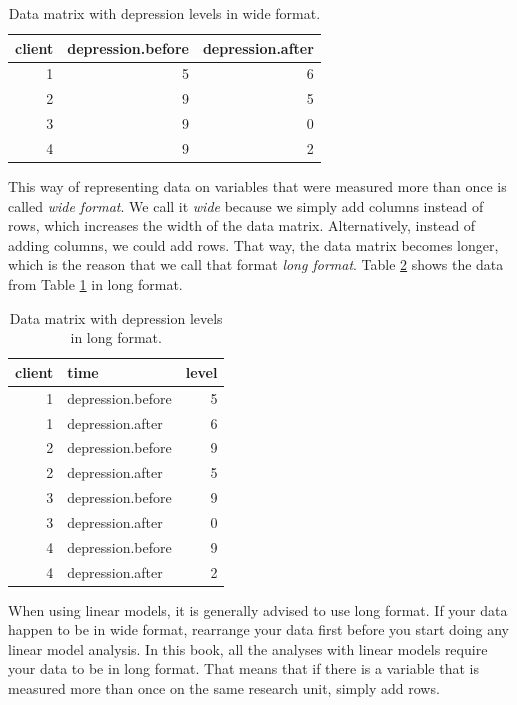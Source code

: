 \documentclass[]{report}\usepackage[]{graphicx}\usepackage[]{color}
\begin{document}
\begin{table}[ht]
\centering
\caption{Data matrix with depression levels in wide format.} 
\label{tab:data_7}
\begin{tabular}{rrr}
  \hline
client & depression.before & depression.after \\ 
  \hline
1 & 5 & 6 \\ 
  2 & 9 & 5 \\ 
  3 & 9 & 0 \\ 
  4 & 9 & 2 \\ 
   \hline
\end{tabular}
\end{table}


This way of representing data on variables that were measured more than once is called \textit{wide format}. We call it \textit{wide} because we simply add columns instead of rows, which increases the width of the data matrix. Alternatively, instead of adding columns, we could add rows. That way, the data matrix becomes longer, which is the reason that we call that format \textit{long format}. Table \ref{tab:data_8} shows the data from Table \ref{tab:data_7} in long format.

\begin{table}[ht]
\centering
\caption{Data matrix with depression levels in long format.} 
\label{tab:data_8}
\begin{tabular}{rlr}
  \hline
client & time & level \\ 
  \hline
1 & depression.before & 5 \\ 
  1 & depression.after & 6 \\ 
  2 & depression.before & 9 \\ 
  2 & depression.after & 5 \\ 
  3 & depression.before & 9 \\ 
  3 & depression.after & 0 \\ 
  4 & depression.before & 9 \\ 
  4 & depression.after & 2 \\ 
   \hline
\end{tabular}
\end{table}


When using linear models, it is generally advised to use long format. If your data happen to be in wide format, rearrange your data first before you start doing any linear model analysis. In this book, all the analyses with linear models require your data to be in long format. That means that if there is a variable that is measured more than once on the same research unit, simply add rows.
\end{document}
